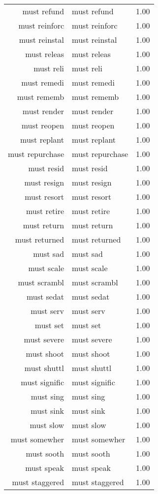 \begin{table}[ht]
\begin{tabular}{rlr}
  must refund & must refund & 1.00 \\ 
  must reinforc & must reinforc & 1.00 \\ 
  must reinstal & must reinstal & 1.00 \\ 
  must releas & must releas & 1.00 \\ 
  must reli & must reli & 1.00 \\ 
  must remedi & must remedi & 1.00 \\ 
  must rememb & must rememb & 1.00 \\ 
  must render & must render & 1.00 \\ 
  must reopen & must reopen & 1.00 \\ 
  must replant & must replant & 1.00 \\ 
  must repurchase & must repurchase & 1.00 \\ 
  must resid & must resid & 1.00 \\ 
  must resign & must resign & 1.00 \\ 
  must resort & must resort & 1.00 \\ 
  must retire & must retire & 1.00 \\ 
  must return & must return & 1.00 \\ 
  must returned & must returned & 1.00 \\ 
  must sad & must sad & 1.00 \\ 
  must scale & must scale & 1.00 \\ 
  must scrambl & must scrambl & 1.00 \\ 
  must sedat & must sedat & 1.00 \\ 
  must serv & must serv & 1.00 \\ 
  must set & must set & 1.00 \\ 
  must severe & must severe & 1.00 \\ 
  must shoot & must shoot & 1.00 \\ 
  must shuttl & must shuttl & 1.00 \\ 
  must signific & must signific & 1.00 \\ 
  must sing & must sing & 1.00 \\ 
  must sink & must sink & 1.00 \\ 
  must slow & must slow & 1.00 \\ 
  must somewher & must somewher & 1.00 \\ 
  must sooth & must sooth & 1.00 \\ 
  must speak & must speak & 1.00 \\ 
  must staggered & must staggered & 1.00 \\ 

\end{tabular}
\end{table}
